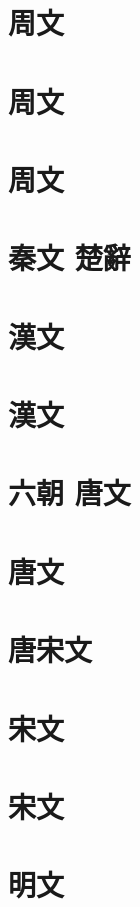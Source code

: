 \documentclass[openany, twoside, 12pt]{utbook}
\makeatletter
\def\emptycleardoublepage{\clearpage\ifodd\c@page\else
\thispagestyle{empty}%
\hbox{}\newpage\fi}
\makeatother
\begin{document}
\chapter[{\small 周文}]{周文}


\chapter[{\small 周文}]{周文}


\chapter[{\small 周文}]{周文}


\chapter[{\small 秦文 楚辭}]{秦文 楚辭}


\chapter[{\small 漢文}]{漢文}


\chapter[{\small 漢文}]{漢文}


\chapter[{\small 六朝 唐文}]{六朝 唐文}


\chapter[{\small 唐文}]{唐文}


\chapter[{\small 唐宋文}]{唐宋文}


\chapter[{\small 宋文}]{宋文}


\chapter[{\small 宋文}]{宋文}


\chapter[{\small 明文}]{明文}


\emptycleardoublepage
\thispagestyle{empty}%
\hbox{}\newpage
\thispagestyle{empty}%
\hbox{}\newpage
\end{document}
